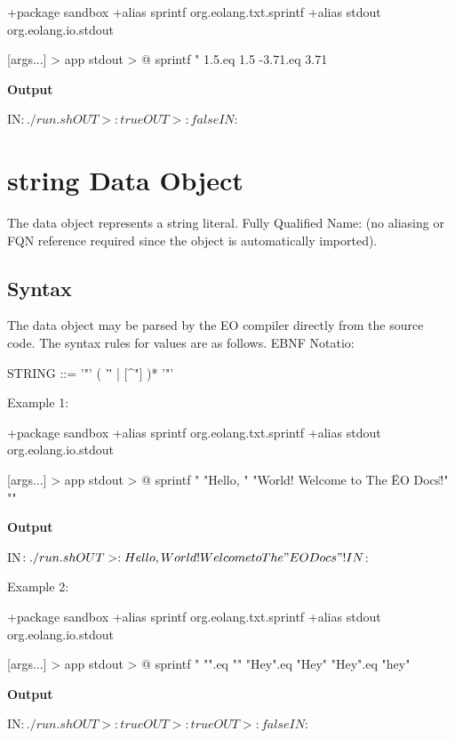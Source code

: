 \documentclass[12pt]{book}
\begin{document}
{\begin{ffcode}
+package sandbox
+alias sprintf org.eolang.txt.sprintf
+alias stdout org.eolang.io.stdout

[args...] > app
  stdout > @
    sprintf
      "%
      1.5.eq 1.5
      -3.71.eq 3.71
\end{ffcode}
\textbf{Output}
\begin{ffcode}
IN$: ./run.sh
OUT>: true
OUT>: false
IN$: 
\end{ffcode}

\section{string Data Object} \label{seciotn:string}
The  data object represents a string literal.
Fully Qualified Name:  (no aliasing or FQN reference required since the object is automatically imported).

\subsection{Syntax}
The  data object may be parsed by the EO compiler directly from the source code. The syntax rules for values are as follows. EBNF Notatio:
\begin{ffcode}

STRING   ::= '"' ( '\"' | [^"] )* '"'
\end{ffcode}
Example 1:
\begin{ffcode}
+package sandbox
+alias sprintf org.eolang.txt.sprintf
+alias stdout org.eolang.io.stdout

[args...] > app
  stdout > @
    sprintf
      "%
      "Hello, "
      "World! Welcome to The \"EO Docs\"!"
      "\n"
\end{ffcode}
\textbf{Output}
\begin{ffcode}
IN$: ./run.sh
OUT>: Hello, World! Welcome to The "EO Docs"!
IN$: 
\end{ffcode}
Example 2:
\begin{ffcode}
+package sandbox
+alias sprintf org.eolang.txt.sprintf
+alias stdout org.eolang.io.stdout

[args...] > app
  stdout > @
    sprintf
      "%
      "".eq ""
      "Hey".eq "Hey"
      "Hey".eq "hey"
\end{ffcode}
\textbf{Output} 
\begin{ffcode}
IN$: ./run.sh
OUT>: true
OUT>: true
OUT>: false
IN$: 
\end{ffcode}

}
\end{document}
